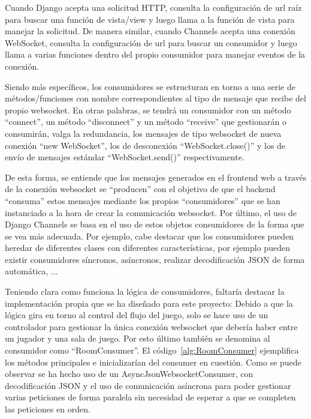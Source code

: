 Cuando Django acepta una solicitud HTTP, consulta la configuración de url raíz para buscar una función de vista/view y luego 
llama a la función de vista para manejar la solicitud. De manera similar, cuando Channels acepta una conexión WebSocket, 
consulta la configuración de url para buscar un consumidor y luego llama a varias funciones dentro del propio consumidor 
para manejar eventos de la conexión.

Siendo más específicos, los consumidores se estructuran en torno a una serie de métodos/funciones con nombre correspondientes al tipo de mensaje 
que recibe del propio websocket. En otras palabras, se tendrá un consumidor con un método ``connect'', un método ``disconnect'' y un método ``receive'' 
que gestionarán o consumirán, valga la redundancia, los mensajes de tipo websocket de nueva conexión ``new WebSocket'', los de desconexión 
``WebSocket.close()'' y los de envío de mensajes estándar ``WebSocket.send()'' respectivamente.

De esta forma, se entiende que los mensajes generados en el frontend web a través de la conexión websocket se ``producen'' con el objetivo
de que el backend ``consuma'' estos mensajes mediante los propios ``consumidores'' que se han instanciado a la hora de crear la comunicación websocket. 
Por último, el uso de Django Channels se basa en el uso de estos objetos consumidores de la forma que se vea 
más adecuada. Por ejemplo, cabe destacar que los consumidores pueden heredar de diferentes clases con diferentes características,
por ejemplo pueden existir consumidores síncronos, asíncronos, realizar decodificación JSON de forma automática, ...

Teniendo clara como funciona la lógica de consumidores, faltaría destacar la implementación propia que se ha diseñado para este proyecto: Debido a que 
la lógica gira en torno al control del flujo del juego, solo se hace uso de un controlador para gestionar la única conexión websocket que debería haber entre
un jugador y una sala de juego. Por esto último también se denomina al consumidor como ``RoomConsumer''. El código~\ref{alg:RoomConsumer} ejemplifica los métodos 
principales e inicializarían del consumer en cuestión. Como se puede observar se ha hecho uso de un AsyncJsonWebsocketConsumer, con decodificación JSON y el uso de 
comunicación asíncrona para poder gestionar varias peticiones de forma paralela sin necesidad de esperar a que se completen las peticiones en orden.

